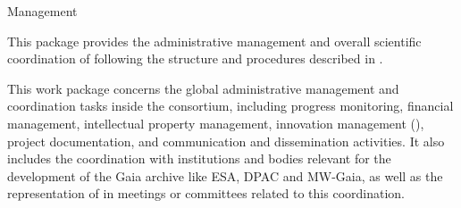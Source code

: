 
\begin{workpackage}{Management}
  \label{wp:management} %

  \wpend{\duration} %


  \makewptable %

  \begin{wpobjectives}
    This package provides the administrative management and overall scientific coordination of {\acro} following the structure and procedures described in .
  \end{wpobjectives}

  \begin{wpdescription}

    This work package concerns the global administrative management and coordination tasks inside the consortium, including progress monitoring, financial management, intellectual property management, innovation management (), project documentation, and communication and dissemination activities. It also includes the coordination with institutions and bodies relevant for the development of the Gaia archive like ESA, DPAC and MW-Gaia, as well as the representation of {\acro} in meetings or committees related to this coordination.

\end{wpdescription}
\end{workpackage}
